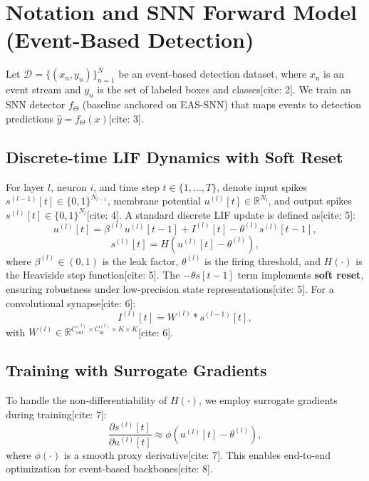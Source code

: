 \documentclass[10pt,journal,compsoc]{IEEEtran}
\begin{document}
\section{Notation and SNN Forward Model (Event-Based Detection)}
Let $\mathcal{D} = \{(x_n, y_n)\}_{n=1}^N$ be an event-based detection dataset, where $x_n$ is an event stream and $y_n$ is the set of labeled boxes and classes[cite: 2]. We train an SNN detector $f_{\Theta}$ (baseline anchored on EAS-SNN) that maps events to detection predictions $\hat{y} = f_{\Theta}(x)$[cite: 3].

\subsection{Discrete-time LIF Dynamics with Soft Reset}
For layer $l$, neuron $i$, and time step $t \in \{1, \dots, T\}$, denote input spikes $s^{(l-1)}[t] \in \{0,1\}^{N_{l-1}}$, membrane potential $u^{(l)}[t] \in \mathbb{R}^{N_l}$, and output spikes $s^{(l)}[t] \in \{0,1\}^{N_l}$[cite: 4]. A standard discrete LIF update is defined as[cite: 5]:
\begin{equation}
u^{(l)}[t] = \beta^{(l)} u^{(l)}[t-1] + I^{(l)}[t] - \theta^{(l)} s^{(l)}[t-1],
\end{equation}
\begin{equation}
s^{(l)}[t] = H\left(u^{(l)}[t] - \theta^{(l)}\right),
\end{equation}
where $\beta^{(l)} \in (0,1)$ is the leak factor, $\theta^{(l)}$ is the firing threshold, and $H(\cdot)$ is the Heaviside step function[cite: 5]. The $-\theta s[t-1]$ term implements \textbf{soft reset}, ensuring robustness under low-precision state representations[cite: 5]. For a convolutional synapse[cite: 6]:
\begin{equation}
I^{(l)}[t] = W^{(l)} * s^{(l-1)}[t],
\end{equation}
with $W^{(l)} \in \mathbb{R}^{C_{\text{out}}^{(l)} \times C_{\text{in}}^{(l)} \times K \times K}$[cite: 6].

\subsection{Training with Surrogate Gradients}
To handle the non-differentiability of $H(\cdot)$, we employ surrogate gradients during training[cite: 7]:
\begin{equation}
\frac{\partial s^{(l)}[t]}{\partial u^{(l)}[t]} \approx \phi\left(u^{(l)}[t] - \theta^{(l)}\right),
\end{equation}
where $\phi(\cdot)$ is a smooth proxy derivative[cite: 7]. This enables end-to-end optimization for event-based backbones[cite: 8].
\end{document}
